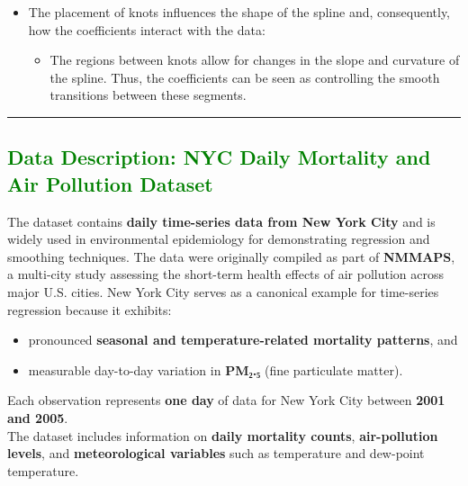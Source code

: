 \documentclass[
  letterpaper,
  DIV=11,
  numbers=noendperiod]{scrreprt}
\providecommand{\tightlist}{%
  \setlength{\itemsep}{0pt}\setlength{\parskip}{0pt}}\usepackage{longtable,booktabs,array}
\begin{document}
\begin{itemize}
  \begin{itemize}
  \item
    The placement of knots influences the shape of the spline and,
    consequently, how the coefficients interact with the data:

    \begin{itemize}
    \tightlist
    \item
      The regions between knots allow for changes in the slope and
      curvature of the spline. Thus, the coefficients can be seen as
      controlling the smooth transitions between these segments.
    \end{itemize}
  \end{itemize}
\end{itemize}

\begin{center}\rule{0.5\linewidth}{0.5pt}\end{center}

\hypertarget{section-26}{%
\subsection*{\texorpdfstring{\textcolor{green}{Data Description: NYC Daily Mortality and Air Pollution Dataset}}{}}\label{section-26}}

The dataset contains \textbf{daily time-series data from New York City}
and is widely used in environmental epidemiology for demonstrating
regression and smoothing techniques. The data were originally compiled
as part of \textbf{NMMAPS}, a multi-city study assessing the short-term
health effects of air pollution across major U.S. cities. New York City
serves as a canonical example for time-series regression because it
exhibits:

\begin{itemize}
\tightlist
\item
  pronounced \textbf{seasonal and temperature-related mortality
  patterns}, and\\
\item
  measurable day-to-day variation in \textbf{PM₂.₅} (fine particulate
  matter).
\end{itemize}

Each observation represents \textbf{one day} of data for New York City
between \textbf{2001 and 2005}.\\
The dataset includes information on \textbf{daily mortality counts},
\textbf{air-pollution levels}, and \textbf{meteorological variables}
such as temperature and dew-point temperature.
\end{document}
